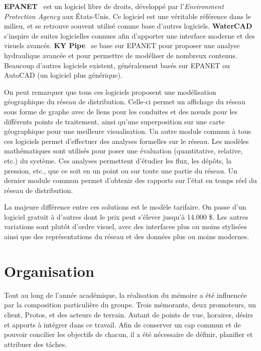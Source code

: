 \documentclass{EPL-master-thesis-covers-FR}
\begin{document}
			\textbf{EPANET}~\cite{ref:epanet} est un logiciel libre de droits, développé par l'\emph{Environment Protection Agency} aux États-Unis. Ce logiciel est une véritable référence dans le milieu, et se retrouve souvent utilisé comme base d'autres logiciels. \textbf{WaterCAD}~\cite{ref:watercad} s'inspire de suites logicielles connues afin d'apporter une interface moderne et des visuels avancés. \textbf{KY Pipe}~\cite{ref:kypipe} se base sur EPANET pour proposer une analyse hydraulique avancée et pour permettre de modéliser de nombreux contenus. Beaucoup d'autres logiciels existent, généralement basés sur EPANET ou AutoCAD (un logiciel plus générique).

			On peut remarquer que tous ces logiciels proposent une modélisation géographique du réseau de distribution. Celle-ci permet un affichage du réseau sous forme de graphe avec de liens pour les conduites et des nœuds pour les différents points de traitement, ainsi qu'une superposition sur une carte géographique pour une meilleure visualisation. Un autre module commun à tous ces logiciels permet d'effectuer des analyses formelles sur le réseau. Les modèles mathématiques sont utilisés pour poser une évaluation (quantitative, relative, etc.) du système. Ces analyses permettent d'étudier les flux, les dépôts, la pression, etc., que ce soit en un point ou sur toute une partie du réseau. Un dernier module commun permet d'obtenir des rapports sur l'état en temps réel du réseau de distribution.

			La majeure différence entre ces solutions est le modèle tarifaire. On passe d'un logiciel gratuit à d'autres dont le prix peut s'élever jusqu'à 14.000 \$. Les autres variations sont plutôt d'ordre visuel, avec des interfaces plus ou moins stylisées ainsi que des représentations du réseau et des données plus ou moins modernes.

	\chapter{Organisation}

		Tout au long de l'année académique, la réalisation du mémoire a été influencée par la composition particulière du groupe. Trois mémorants, deux promoteurs, un client, Protos, et des acteurs de terrain. Autant de points de vue, horaires, désirs et apports à intégrer dans ce travail. Afin de conserver un cap commun et de pouvoir concilier les objectifs de chacun, il a été nécessaire de définir, planifier et attribuer des tâches. %
\end{document}
